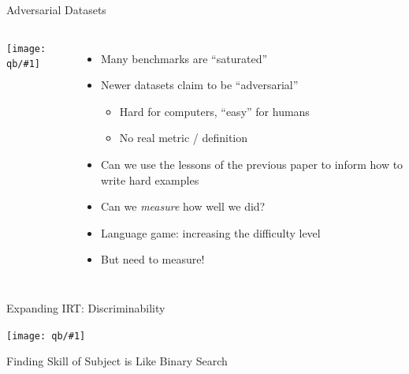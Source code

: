 \documentclass[compress]{beamer}
\newcommand{\gfxq}[2]{
\begin{center}
	\texttt{[image: qb/\#1]}
\end{center}
}
\begin{document}
  \begin{frame}{Adversarial Datasets}

    \begin{columns}
      \gfxq{benchmark_saturation}{1.0}
            \begin{itemize}
              
            \item Many benchmarks are ``saturated''
            \item Newer datasets claim to be ``adversarial''
              \begin{itemize}
              \item Hard for computers, ``easy'' for humans
              \item No real metric / definition
              \end{itemize}
            \item Can we use the lessons of the previous paper to inform how to write hard examples
            \item Can we \emph{measure} how well we did?
              \pause
            \item Language game: increasing the difficulty level
              \item But need to measure!
    \end{itemize}
            \end{columns}
 \end{frame}

    \begin{frame}{Expanding IRT: Discriminability}

    \gfxq{discrimination}{1.0}

      \end{frame}
    
    \begin{frame}{Finding Skill of Subject is Like Binary Search}
    	\only<1>{\gfxq{discrimination_1}{1.0}}
    	\only<2>{\gfxq{discrimination_2}{1.0}}
    	\only<3>{\gfxq{discrimination_3}{1.0}}
    	\only<4>{\gfxq{discrimination_4}{1.0}}
    	\only<5>{\gfxq{discrimination_5}{1.0}}
    \end{frame}
    
\end{document}
